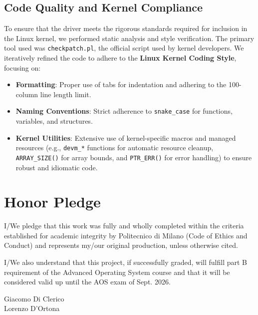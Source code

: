 \documentclass[10pt,a4paper]{article}
\begin{document}
\subsection{Code Quality and Kernel Compliance}
To ensure that the driver meets the rigorous standards required for inclusion in the Linux kernel, we performed static analysis and style verification. The primary tool used was \texttt{checkpatch.pl}, the official script used by kernel developers. We iteratively refined the code to adhere to the \textbf{Linux Kernel Coding Style}, focusing on:
\begin{itemize}
    \item \textbf{Formatting}: Proper use of tabs for indentation and adhering to the 100-column line length limit.
    \item \textbf{Naming Conventions}: Strict adherence to \texttt{snake\_case} for functions, variables, and structures.
    \item \textbf{Kernel Utilities}: Extensive use of kernel-specific macros and managed resources (e.g., \texttt{devm\_*} functions for automatic resource cleanup, \texttt{ARRAY\_SIZE()} for array bounds, and \texttt{PTR\_ERR()} for error handling) to ensure robust and idiomatic code.
\end{itemize}

\section{Honor Pledge}

I/We pledge that this work
 was fully and wholly completed within the criteria
established for academic integrity by Politecnico di Milano (Code of Ethics and
Conduct) and represents my/our original production, unless otherwise cited.

I/We also understand that this project, if successfully graded,  will fulfill part B requirement of the
Advanced Operating System course and that it will be considered valid up until
the AOS exam of Sept. 2026. 

\begin{flushright}
Giacomo Di Clerico \\
Lorenzo D'Ortona
\end{flushright}
\end{document}
